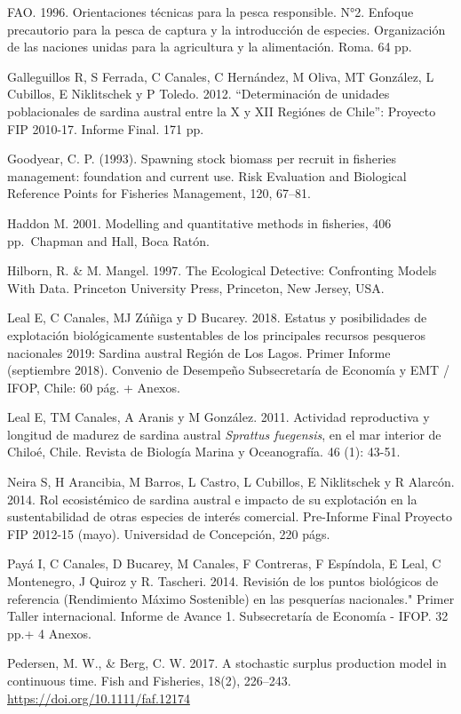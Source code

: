 \documentclass[
  spanish,
]{article}
\begin{document}
FAO. 1996. Orientaciones técnicas para la pesca responsible. N°2.
Enfoque precautorio para la pesca de captura y la introducción de
especies. Organización de las naciones unidas para la agricultura y la
alimentación. Roma. 64 pp.

Galleguillos R, S Ferrada, C Canales, C Hernández, M Oliva, MT González,
L Cubillos, E Niklitschek y P Toledo. 2012. ``Determinación de unidades
poblacionales de sardina austral entre la X y XII Regiónes de Chile'':
Proyecto FIP 2010-17. Informe Final. 171 pp.

Goodyear, C. P. (1993). Spawning stock biomass per recruit in fisheries
management: foundation and current use. Risk Evaluation and Biological
Reference Points for Fisheries Management, 120, 67--81.

Haddon M. 2001. Modelling and quantitative methods in fisheries, 406
pp.~Chapman and Hall, Boca Ratón.

Hilborn, R. \& M. Mangel. 1997. The Ecological Detective: Confronting
Models With Data. Princeton University Press, Princeton, New Jersey,
USA.

Leal E, C Canales, MJ Zúñiga y D Bucarey. 2018. Estatus y posibilidades
de explotación biológicamente sustentables de los principales recursos
pesqueros nacionales 2019: Sardina austral Región de Los Lagos. Primer
Informe (septiembre 2018). Convenio de Desempeño Subsecretaría de
Economía y EMT / IFOP, Chile: 60 pág. + Anexos.

Leal E, TM Canales, A Aranis y M González. 2011. Actividad reproductiva
y longitud de madurez de sardina austral \emph{Sprattus fuegensis}, en
el mar interior de Chiloé, Chile. Revista de Biología Marina y
Oceanografía. 46 (1): 43-51.

Neira S, H Arancibia, M Barros, L Castro, L Cubillos, E Niklitschek y R
Alarcón. 2014. Rol ecosistémico de sardina austral e impacto de su
explotación en la sustentabilidad de otras especies de interés
comercial. Pre-Informe Final Proyecto FIP 2012-15 (mayo). Universidad de
Concepción, 220 págs.

Payá I, C Canales, D Bucarey, M Canales, F Contreras, F Espíndola, E
Leal, C Montenegro, J Quiroz y R. Tascheri. 2014. Revisión de los puntos
biológicos de referencia (Rendimiento Máximo Sostenible) en las
pesquerías nacionales." Primer Taller internacional. Informe de Avance
1. Subsecretaría de Economía - IFOP. 32 pp.+ 4 Anexos.

Pedersen, M. W., \& Berg, C. W. 2017. A stochastic surplus production
model in continuous time. Fish and Fisheries, 18(2), 226--243.
\url{https://doi.org/10.1111/faf.12174}
\end{document}
